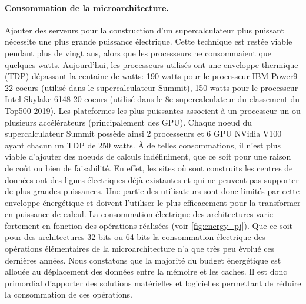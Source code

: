         \paragraph{Consommation de la microarchitecture.} 
            
            Ajouter des serveurs pour la construction d'un supercalculateur plus puissant nécessite une plus grande puissance électrique. Cette technique est restée viable pendant plus de vingt ans, alors que les processeurs ne consommaient que quelques watts. Aujourd'hui, les processeurs utilisés ont une enveloppe thermique (TDP) dépassant la centaine de watts: 190 watts pour le processeur IBM Power9 22 coeurs (utilisé dans le supercalculateur Summit), 150 watts pour le processeur Intel Skylake 6148 20 coeurs (utilisé dans le 8e supercalculateur du classement du Top500 2019). Les plateformes les plus puissantes associent à un processeur un ou plusieurs accélérateurs (principalement des GPU). Chaque noeud du supercalculateur Summit possède ainsi 2 processeurs et 6 GPU NVidia V100 ayant chacun un TDP de 250 watts. À de telles consommations, il n'est plus viable d'ajouter des noeuds de calculs indéfiniment, que ce soit pour une raison de coût ou bien de faisabilité. En effet, les sites où sont construits les centres de données ont des lignes électriques déjà existantes et qui ne peuvent pas supporter de plus grandes puissances. Une partie des utilisateurs sont donc limités par cette enveloppe énergétique et doivent l'utiliser le plus efficacement pour la transformer en puissance de calcul. La consommation électrique des architectures varie fortement en fonction des opérations réalisées (voir \autoref{fig:energy_pj}). Que ce soit pour des architectures 32 bits \cite{Horowitz2014} ou 64 bits \cite{Leland2014} la consommation électrique des opérations élémentaires de la microarchitecture n’a que très peu évolué ces dernières années. Nous constatons que la majorité du budget énergétique est allouée au déplacement des données entre la mémoire et les caches. Il est donc primordial d'apporter des solutions matérielles et logicielles permettant de réduire la consommation de ces opérations.
        
